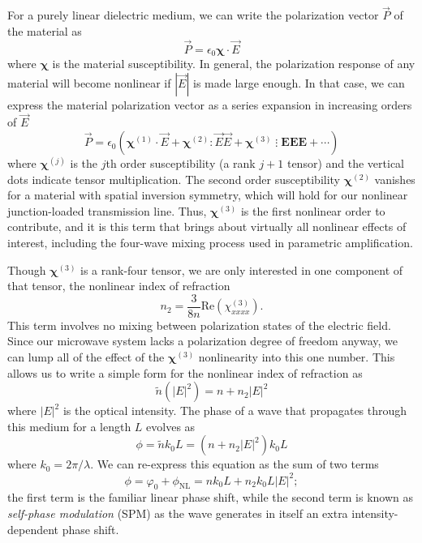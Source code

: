 For a purely linear dielectric medium, we can write the polarization vector $\vec{P}$ of the material as
\begin{equation}
\vec{P} = \epsilon_0 \boldsymbol{\chi} \cdot \vec{E}
\end{equation}
where $\boldsymbol{\chi}$ is the material susceptibility.  In general, the polarization response of any material will become nonlinear if $|\vec{E}|$ is made large enough.  In that case, we can express the material polarization vector as a series expansion in increasing orders of $\vec{E}$
\begin{equation}
\vec{P} = \epsilon_0 \left( \boldsymbol{\chi}^{(1)} \cdot \vec{E} + \boldsymbol{\chi}^{(2)} : \vec{E}\vec{E} + \boldsymbol{\chi}^{(3)}\mathbin{\vdots} \mathbf{EEE}+ \cdots \right)
\label{eq:P_NL}
\end{equation}
where $\boldsymbol{\chi}^{(j)}$ is the $j$th order susceptibility (a rank $j+1$ tensor) and the vertical dots indicate tensor multiplication.  The second order susceptibility $\boldsymbol{\chi}^{(2)}$ vanishes for a material with spatial inversion symmetry, which will hold for our nonlinear junction-loaded transmission line.  Thus, $\boldsymbol{\chi}^{(3)}$ is the first nonlinear order to contribute, and it is this term that brings about virtually all nonlinear effects of interest, including the four-wave mixing process used in parametric amplification.

Though $\boldsymbol{\chi}^{(3)}$ is a rank-four tensor, we are only interested in one component of that tensor, the nonlinear index of refraction
\begin{equation}
n_2 = \frac{3}{8n} \textrm{Re}(\chi^{(3)}_{xxxx}).
\end{equation}
This term involves no mixing between polarization states of the electric field.  Since our microwave system lacks a polarization degree of freedom anyway, we can lump all of the effect of the $\boldsymbol{\chi}^{(3)}$ nonlinearity into this one number.  This allows us to write a simple form for the nonlinear index of refraction as
\begin{equation}
\tilde{n}(|E|^2) = n + n_2 |E|^2
\end{equation}
where $|E|^2$ is the optical intensity.  The phase of a wave that propagates through this medium for a length $L$ evolves as
\begin{equation}
\phi = \tilde{n} k_0 L = (n + n_2 |E|^2)k_0 L
\end{equation}
where $k_0 = 2\pi/\lambda$.  We can re-express this equation as the sum of two terms
\begin{equation}
\phi = \varphi_{0} + \phi_{\textrm{NL}} = n k_0 L + n_2 k_0 L |E|^2;
\end{equation}
the first term is the familiar linear phase shift, while the second term is known as \textit{self-phase modulation} (SPM) as the wave generates in itself an extra intensity-dependent phase shift.

